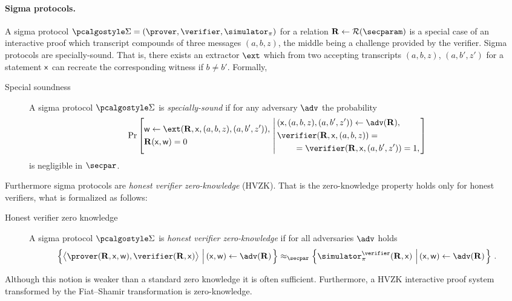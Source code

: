 \documentclass[runningheads]{llncs}
\theoremstyle{definition}
\begin{document}
\paragraph{Sigma protocols.}
A sigma protocol $\sigmaprot = (\prover, \verifier, \simulator_\zkproof)$  for a relation $\REL \gets \RELGEN(\secparam)$ is a special case of an interactive proof which transcript compounds of three messages $(a, b, z)$, the middle being a challenge provided by the verifier.
Sigma protocols are specially-sound. That is, there exists an extractor $\ext$ which from two accepting transcripts $(a, b, z)$, $(a, b', z')$ for a statement $\mathsf{x}$ can recreate the corresponding witness if $b \neq b'$. Formally,
\begin{description}
	\item[Special soundness] A sigma protocol $\sigmaprot$ is \emph{specially-sound} if for any adversary $\adv$ the probability
	\[
		\Pr\left[
		\begin{aligned}
				& \wit \gets \ext(\REL, \inp, (a, b, z), (a, b', z')),\\
				& \REL(\inp, \wit) = 0
		\end{aligned}		
		\,\left|\,
		\begin{aligned}
			& (\inp, (a, b, z), (a, b', z')) \gets \adv(\REL), \\
			& \verifier(\REL, \inp, (a, b, z)) = \\
			& \qquad = \verifier(\REL, \inp, (a, b', z')) = 1, \\
		\end{aligned}
		\right.\right]
	\]
	is negligible in $\secpar$.
\end{description}

Furthermore sigma protocols are \emph{honest verifier zero-knowledge} (HVZK). That is the zero-knowledge property holds only for honest verifiers, what is formalized as follows:
\begin{description}
	\item[Honest verifier zero knowledge] A sigma protocol $\sigmaprot$ is \emph{honest verifier zero-knowledge} if for all adversaries $\adv$ holds
	\begin{multline*}
		\left\{\ip{\prover(\REL, \inp, \wit)}{\verifier(\REL, \inp)} \,\left|\, (\inp, \wit) \gets \adv(\REL)\vphantom{\simulator_\zkproof^\adv}\right.\right\} \approx_\secpar 
		\left\{\simulator_\zkproof^{\verifier}(\REL, \inp)\,\left|\, (\inp, \wit) \gets \adv(\REL)\vphantom{\simulator_\zkproof^\adv}\right.\right\}\,.
	\end{multline*}
\end{description}
Although this notion is weaker than a standard zero knowledge it is often sufficient. Furthermore, a HVZK interactive proof system transformed by the Fiat--Shamir transformation is zero-knowledge.
\end{document}
